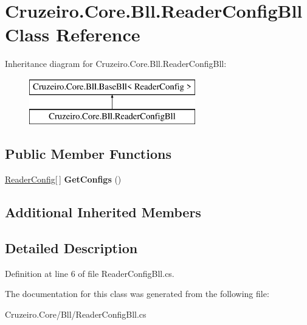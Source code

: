 \hypertarget{class_cruzeiro_1_1_core_1_1_bll_1_1_reader_config_bll}{}\section{Cruzeiro.\+Core.\+Bll.\+Reader\+Config\+Bll Class Reference}
\label{class_cruzeiro_1_1_core_1_1_bll_1_1_reader_config_bll}
Inheritance diagram for Cruzeiro.\+Core.\+Bll.\+Reader\+Config\+Bll\+:\begin{figure}[H]
\begin{center}
\leavevmode
\includegraphics[height=2.000000cm]{class_cruzeiro_1_1_core_1_1_bll_1_1_reader_config_bll}
\end{center}
\end{figure}
\subsection*{Public Member Functions}
\begin{DoxyCompactItemize}
\item 
\hyperlink{class_cruzeiro_1_1_core_1_1_model_1_1_reader_config}{Reader\+Config}\mbox{[}$\,$\mbox{]} {\bfseries Get\+Configs} ()\hypertarget{class_cruzeiro_1_1_core_1_1_bll_1_1_reader_config_bll_ae9d668ad81b8a9b4004de8c8aded050d}{}\label{class_cruzeiro_1_1_core_1_1_bll_1_1_reader_config_bll_ae9d668ad81b8a9b4004de8c8aded050d}

\end{DoxyCompactItemize}
\subsection*{Additional Inherited Members}


\subsection{Detailed Description}


Definition at line 6 of file Reader\+Config\+Bll.\+cs.



The documentation for this class was generated from the following file\+:\begin{DoxyCompactItemize}
\item 
Cruzeiro.\+Core/\+Bll/Reader\+Config\+Bll.\+cs\end{DoxyCompactItemize}
